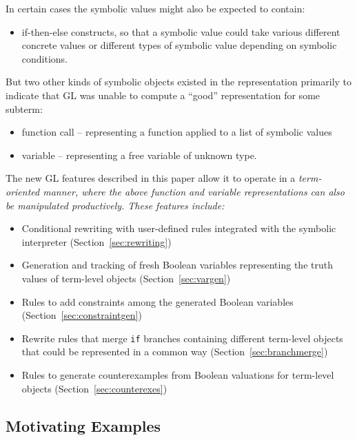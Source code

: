 \documentclass[submission,copyright,creativecommons]{eptcs}
\begin{document}
In certain cases the symbolic values might also be expected to contain:

\begin{itemize}
\item if-then-else constructs, so that a symbolic value could take
  various different concrete values or different types of symbolic
  value depending on symbolic conditions.
\end{itemize}

But two other kinds of symbolic objects existed in the representation
primarily to indicate that GL was unable to compute a ``good''
representation for some subterm:

\begin{itemize}
\item function call -- representing a function applied to a list of
  symbolic values
\item variable -- representing a free variable of unknown type.
\end{itemize}

The new GL features described in this paper allow it to operate in a
\em{term-oriented} manner, where the above function and variable
representations can also be manipulated productively.  These features include:
\begin{itemize}
\item Conditional rewriting with user-defined rules integrated with the symbolic interpreter (Section~\ref{sec:rewriting})
\item Generation and tracking of fresh Boolean variables representing the truth values of term-level objects (Section~\ref{sec:vargen})
\item Rules to add constraints among the generated Boolean variables (Section~\ref{sec:constraintgen})
\item Rewrite rules that merge \texttt{if} branches containing different term-level objects that could be represented in a common way (Section~\ref{sec:branchmerge})
\item Rules to generate counterexamples from Boolean valuations for term-level objects (Section~\ref{sec:counterexes})
\end{itemize}


\subsection{Motivating Examples}
\end{document}
